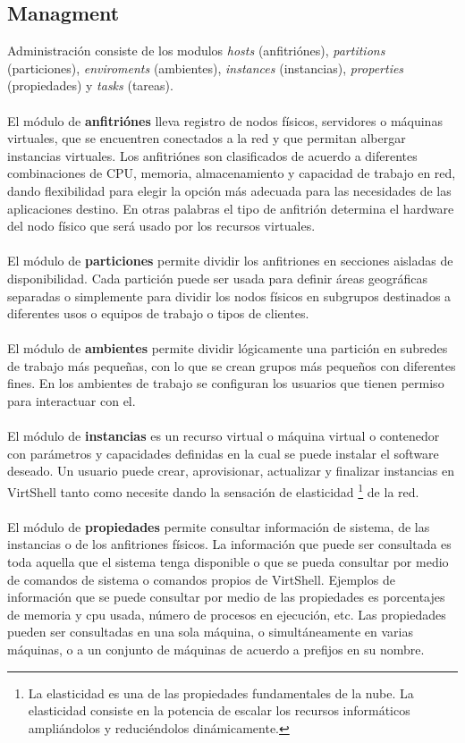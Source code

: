 \documentclass[conference, spanish]{IEEEtran}
\begin{document}
\subsection{Managment}
Administración consiste de los modulos \emph{hosts} (anfitriónes), \emph{partitions} (particiones), \emph{enviroments} (ambientes), \emph{instances} (instancias), \emph{properties} (propiedades) y \emph{tasks} (tareas). \\
\\
El módulo de \textbf{anfitriónes} lleva registro de nodos físicos, servidores o máquinas virtuales, que se encuentren conectados a la red y que permitan albergar instancias virtuales. Los anfitriónes son clasificados de acuerdo a diferentes combinaciones de CPU, memoria, almacenamiento y capacidad de trabajo en red, dando flexibilidad para elegir la opción más adecuada para las necesidades de las aplicaciones destino. En otras palabras el tipo de anfitrión determina el hardware del nodo físico que será usado por los recursos virtuales.\\
\\
El módulo de \textbf{particiones} permite dividir los anfitriones en secciones aisladas de disponibilidad. Cada partición puede ser usada para definir áreas geográficas separadas o simplemente para dividir los nodos físicos en subgrupos destinados a diferentes usos o equipos de trabajo o tipos de clientes.\\
\\
El módulo de \textbf{ambientes} permite dividir lógicamente una partición en subredes de trabajo más pequeñas, con lo que se crean grupos más pequeños con diferentes fines. En los ambientes de trabajo se configuran los usuarios que tienen permiso para interactuar con el.\\
\\
El módulo de \textbf{instancias} es un recurso virtual o máquina virtual o contenedor con parámetros y capacidades definidas en la cual se puede instalar el software deseado. Un usuario puede crear, aprovisionar, actualizar y finalizar instancias en VirtShell tanto como necesite dando la sensación de elasticidad \footnote{La elasticidad es una de las propiedades fundamentales de la nube. La elasticidad consiste en la potencia de escalar los recursos informáticos ampliándolos y reduciéndolos dinámicamente.} de la red.\\
\\
El módulo de \textbf{propiedades} permite consultar información de sistema, de las instancias o de los anfitriones físicos. La información que puede ser consultada es toda aquella que el sistema tenga disponible o que se pueda consultar por medio de comandos de sistema o comandos propios de VirtShell. Ejemplos de información que se puede consultar por medio de las propiedades es porcentajes de memoria y cpu usada, número de procesos en ejecución, etc. Las propiedades pueden ser consultadas en una sola máquina, o simultáneamente en varias máquinas, o a un conjunto de máquinas de acuerdo a prefijos en su nombre.\\
\end{document}
